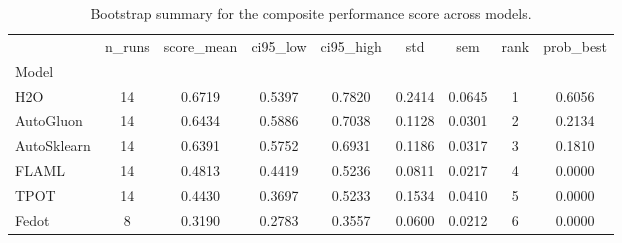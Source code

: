 \begin{table}
\centering
\caption{Bootstrap summary for the composite performance score across models.}
\label{tab:bootstrap_metrics}
\begin{tabular}{lcccccccc}
\toprule
{} &  n_runs &  score_mean &  ci95_low &  ci95_high &     std &     sem &  rank &  prob_best \\
Model       &         &             &           &            &         &         &       &            \\
\midrule
H2O         &      14 &      0.6719 &    0.5397 &     0.7820 &  0.2414 &  0.0645 &     1 &     0.6056 \\
AutoGluon   &      14 &      0.6434 &    0.5886 &     0.7038 &  0.1128 &  0.0301 &     2 &     0.2134 \\
AutoSklearn &      14 &      0.6391 &    0.5752 &     0.6931 &  0.1186 &  0.0317 &     3 &     0.1810 \\
FLAML       &      14 &      0.4813 &    0.4419 &     0.5236 &  0.0811 &  0.0217 &     4 &     0.0000 \\
TPOT        &      14 &      0.4430 &    0.3697 &     0.5233 &  0.1534 &  0.0410 &     5 &     0.0000 \\
Fedot       &       8 &      0.3190 &    0.2783 &     0.3557 &  0.0600 &  0.0212 &     6 &     0.0000 \\
\bottomrule
\end{tabular}
\end{table}
